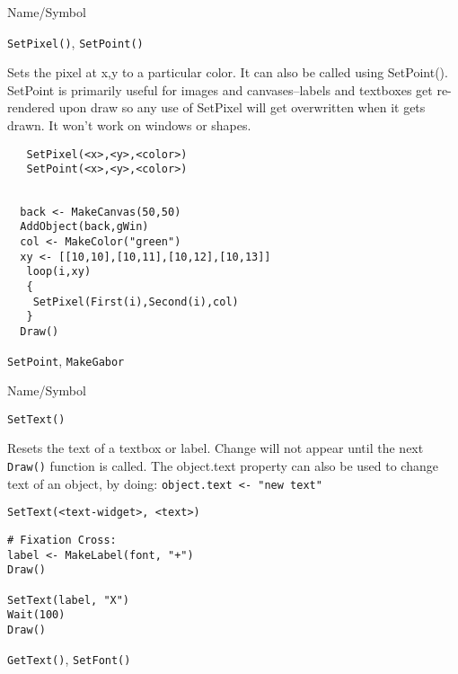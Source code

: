 \begin{desc}{Name/Symbol}
\item[Name/Symbol]	\verb+SetPixel()+, \verb+SetPoint()+

\item[Description] Sets the pixel at x,y to a particular color.  It
  can also be called using SetPoint().  SetPoint is primarily useful
  for images and canvases--labels and textboxes get re-rendered upon
  draw so any use of SetPixel will get overwritten when it gets
  drawn.  It won't work on windows or shapes.

\item[Usage]
\begin{verbatim}
   SetPixel(<x>,<y>,<color>)
   SetPoint(<x>,<y>,<color>)
\end{verbatim}

\item[Example]	
\begin{verbatim}

  back <- MakeCanvas(50,50)
  AddObject(back,gWin)
  col <- MakeColor("green")
  xy <- [[10,10],[10,11],[10,12],[10,13]]
   loop(i,xy)
   {
    SetPixel(First(i),Second(i),col)
   }
  Draw()
\end{verbatim}


\item[See Also]
  \verb+SetPoint+, \verb+MakeGabor+
\end{desc}


\begin{desc}{Name/Symbol}

\item[Name/Symbol] 	\verb+SetText()+

\item[Description] 	Resets the text of a textbox or label.  Change will not
		appear until the next \verb+Draw()+ function is called.  The
object.text property can also be used to change text of an object, by
doing: \verb+object.text <- "new text"+

\item[Usage]
\begin{verbatim}
SetText(<text-widget>, <text>)
\end{verbatim}

\item[Example]
\begin{verbatim}
# Fixation Cross:
label <- MakeLabel(font, "+")
Draw()

SetText(label, "X")
Wait(100)
Draw()
\end{verbatim}

\item[See Also]    	\verb+GetText()+, \verb+SetFont()+
\end{desc}

